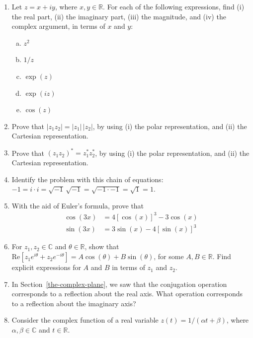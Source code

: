 \documentclass[10pt,a4paper]{article}
\begin{document}
\begin{enumerate}
\item
  Let $z = x + iy$, where $x, y \in \mathbb{R}$. For each of the
  following expressions, find (i) the real part, (ii) the imaginary
  part, (iii) the magnitude, and (iv) the complex argument, in terms of
  $x$ and $y$:

  \begin{enumerate}[(a)]
  \item $z^2$
  \item $1/z$
  \item $\exp(z)$
  \item $\exp(iz)$
  \item $\cos(z)$
  \end{enumerate}

\item
  Prove that $|z_1 z_2| = |z_1|\, |z_2|$, by using (i) the polar
  representation, and (ii) the Cartesian representation.

\item
  Prove that $(z_1 z_2)^* = z_1^* z_2^*$, by using (i) the polar
  representation, and (ii) the Cartesian representation.

\item
  Identify the problem with this chain of equations: $-1 = i \cdot i =
  \sqrt{-1}\,\sqrt{-1} = \sqrt{-1 \cdot -1} = \sqrt{1} = 1.$

\item
  With the aid of Euler's formula, prove that
  \begin{align}
    \cos(3x) &= 4[\cos(x)]^3 -3\cos(x) \\
    \sin(3x) &= 3\sin(x)-4[\sin(x)]^3
  \end{align}

\item
  For $z_1, z_2 \in \mathbb{C}$ and $\theta \in \mathbb{R}$, show that
  $\mathrm{Re}\left[z_1 e^{i\theta} + z_2 e^{-i\theta}\right] = A
  \cos(\theta) + B \sin(\theta)$, for some $A, B \in \mathbb{R}$. Find
  explicit expressions for $A$ and $B$ in terms of $z_1$ and $z_2$.

\item
  In Section~\ref{the-complex-plane}, we saw that the conjugation
  operation corresponds to a reflection about the real axis. What
  operation corresponds to a reflection about the imaginary axis?

\item
  Consider the complex function of a real variable $z(t) = 1/(\alpha t
  + \beta)$, where $\alpha, \beta \in \mathbb{C}$ and $t \in
  \mathbb{R}$.


\end{enumerate}
\end{document}
